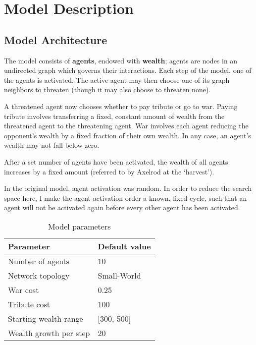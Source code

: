\documentclass{article}
\begin{document}
\section{Model Description}

\subsection{Model Architecture}

The model consists of \textbf{agents}, endowed with \textbf{wealth}; agents are nodes in an undirected graph which governs their interactions. Each step of the model, one of the agents is activated. The active agent may then choose one of its graph neighbors to threaten (though it may also choose to threaten none).

A threatened agent now chooses whether to pay tribute or go to war. Paying tribute involves transferring a fixed, constant amount of wealth from the threatened agent to the threatening agent. War involves each agent reducing the opponent's wealth by a fixed fraction of their own wealth. In any case, an agent's wealth may not fall below zero.

After a set number of agents have been activated, the wealth of all agents increases by a fixed amount (referred to by Axelrod at the `harvest').

In the original model, agent activation was random. In order to reduce the search space here, I make the agent activation order a known, fixed cycle, such that an agent will not be activated again before every other agent has been activated.

\begin{table}[h]
\begin{tabular}{@{}ll@{}}
\toprule
\textbf{Parameter}               & \textbf{Default value}                            \\ \midrule
Number of agents       & 10                                       \\
Network topology       & Small-World                              \\
War cost               & 0.25                                     \\
Tribute cost           & 100                                      \\
Starting wealth range        &  {[}300, 500{]} \\
Wealth growth per step & 20                                      \\ \bottomrule
\end{tabular}
\caption{Model parameters}
\end{table}
\end{document}
